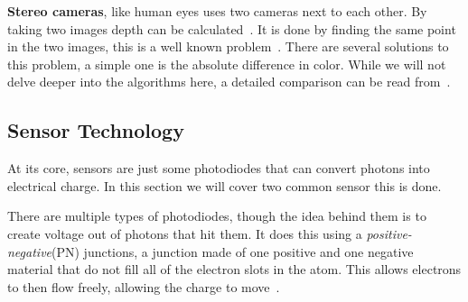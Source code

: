 \textbf{Stereo cameras}, like human eyes uses two cameras next to each other.
By taking two images depth can be calculated~\cite{adi2017distance}. It is done
by finding the same point in the two images, this is a well known problem~\cite{scharstein2002taxonomy}.
There are several solutions to this problem,
a simple one is the absolute difference in color. While we will not delve
deeper into the algorithms here, a detailed comparison can be read from~\cite{scharstein2002taxonomy}.

\subsection{Sensor Technology}\label{section:sensortechnology}
At its core, sensors are just some photodiodes that can convert photons
into electrical charge. In this section we will cover two common sensor this is
done.

There are multiple types of photodiodes, though the idea behind them is to
create voltage out of photons that hit them. It does this using a
\textit{positive-negative}(PN) junctions, a junction made of one positive and
one negative material that do not fill all of the electron slots in the atom.
This allows electrons to then flow freely, allowing the charge to
move~\cite{peterson2001works}.

\begin{figure}
    \centering
    \caption{}
\end{figure}

